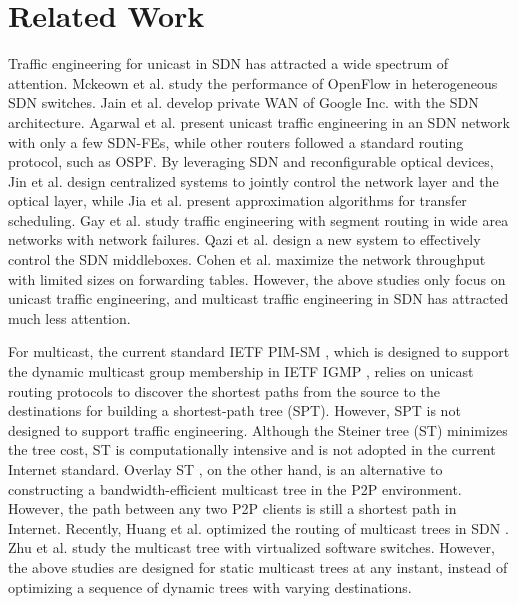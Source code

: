 \documentclass[10pt, conference, letterpaper]{IEEEtran}
\theoremstyle{definition}
\begin{document}
\section{Related Work}\label{sec: related work}
Traffic engineering for unicast in SDN has attracted a wide spectrum of attention. Mckeown et al. \cite{OpenFlow} study the performance of OpenFlow in heterogeneous SDN switches. Jain et al. \cite{B4} develop private WAN of Google Inc. with the SDN architecture.
Agarwal et al. \cite{TE-SDN} present unicast traffic engineering in an SDN network with only a few SDN-FEs, while other routers followed a standard routing protocol, such as OSPF. By leveraging SDN and reconfigurable optical devices, Jin et al. \cite{BulkTransferSDOpticalWAN} design centralized systems to jointly control the network layer and the optical layer, while Jia et al. \cite{MinMakespanUnicastSDOpticalWAN} present approximation algorithms for transfer scheduling. Gay et al. \cite{QuickReactUnexpectedChanges} study traffic engineering with segment routing in wide area networks with network failures. Qazi et al. \cite{SIMPLE-fying} design a new system to effectively control the SDN middleboxes. Cohen et al. \cite{TableUtilization-SDN} maximize the network throughput with limited sizes on forwarding tables. However, the above studies only focus on  unicast traffic engineering, and multicast traffic engineering in SDN has attracted much less attention.


For multicast, the current standard IETF PIM-SM \cite{RFC4601}, which is designed to support the dynamic multicast group membership in IETF IGMP \cite{RFC2236}, relies on unicast routing protocols to discover the shortest paths from the source to the destinations for building a shortest-path tree (SPT). However, SPT is not designed to support traffic engineering. Although the Steiner tree (ST) \cite{STProblems} minimizes the tree cost, ST is computationally intensive and is not adopted in the current Internet standard. Overlay ST \cite{OverlayST1,OverlayST2}, on the other hand, is an alternative to constructing a bandwidth-efficient multicast tree in the P2P environment. However, the path between any two P2P clients is still a shortest path in Internet. Recently,
Huang et al. optimized the routing of multicast trees in SDN \cite{ScalableMulticastforSDN,reliableMulticastforSDN,multicastTEforSDN}.
Zhu et al. \cite{Multicast-VirtualDCNetwork} study the multicast tree with virtualized software switches. However, the above studies are designed for static multicast trees at any instant, instead of optimizing a sequence of dynamic trees with varying destinations. 
\end{document}
